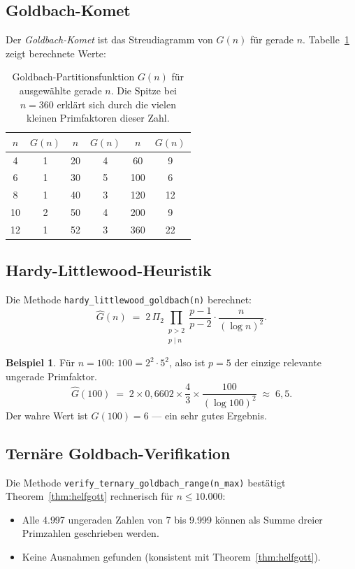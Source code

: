 \documentclass[12pt,a4paper]{amsart}
\theoremstyle{definition}
\newtheorem{beispiel}[theorem]{Beispiel}
\begin{document}
\subsection{Goldbach-Komet}

Der \emph{Goldbach-Komet} ist das Streudiagramm von $G(n)$ f\"{u}r gerade $n$.
Tabelle~\ref{tab:komet} zeigt berechnete Werte:

\begin{table}[h]
\centering
\begin{tabular}{@{}cc|cc|cc@{}}
\toprule
$n$ & $G(n)$ & $n$ & $G(n)$ & $n$ & $G(n)$ \\
\midrule
4   & 1  & 20  & 4  & 60  & 9  \\
6   & 1  & 30  & 5  & 100 & 6  \\
8   & 1  & 40  & 3  & 120 & 12 \\
10  & 2  & 50  & 4  & 200 & 9  \\
12  & 1  & 52  & 3  & 360 & 22 \\
\bottomrule
\end{tabular}
\caption{Goldbach-Partitionsfunktion $G(n)$ f\"{u}r ausgew\"{a}hlte gerade $n$.
Die Spitze bei $n = 360$ erkl\"{a}rt sich durch die vielen kleinen
Primfaktoren dieser Zahl.}
\label{tab:komet}
\end{table}

\subsection{Hardy-Littlewood-Heuristik}

Die Methode \texttt{hardy\_littlewood\_goldbach(n)} berechnet:
\[
  \widehat{G}(n) \;=\; 2\,\Pi_2
  \prod_{\substack{p > 2 \\ p \mid n}} \frac{p-1}{p-2}
  \cdot \frac{n}{(\log n)^2}.
\]

\begin{beispiel}
F\"{u}r $n = 100$: $100 = 2^2 \cdot 5^2$, also ist $p = 5$ der einzige
relevante ungerade Primfaktor.
\[
  \widehat{G}(100) \;=\; 2 \times 0{,}6602 \times \frac{4}{3} \times
  \frac{100}{(\log 100)^2} \;\approx\; 6{,}5.
\]
Der wahre Wert ist $G(100) = 6$ --- ein sehr gutes Ergebnis.
\end{beispiel}

\subsection{Tern\"{a}re Goldbach-Verifikation}

Die Methode \texttt{verify\_ternary\_goldbach\_range(n\_max)} best\"{a}tigt
Theorem~\ref{thm:helfgott} rechnerisch f\"{u}r $n \leq 10{.}000$:
\begin{itemize}
\item Alle 4{.}997 ungeraden Zahlen von 7 bis 9{.}999 k\"{o}nnen als
      Summe dreier Primzahlen geschrieben werden.
\item Keine Ausnahmen gefunden (konsistent mit Theorem~\ref{thm:helfgott}).
\end{itemize}
\end{document}
